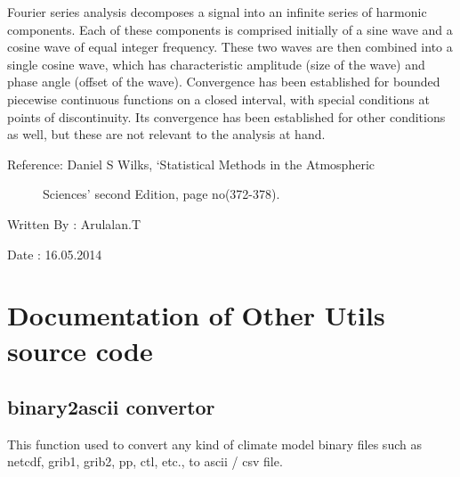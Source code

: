 \documentclass[letterpaper,10pt,english]{sphinxmanual}
\begin{document}
\begin{fulllineitems}
Fourier series analysis decomposes a signal into an infinite series of 
harmonic components. Each of these components is comprised initially of 
a sine wave and a cosine wave of equal integer frequency. These two waves
are then combined into a single cosine wave, which has characteristic 
amplitude (size of the wave) and phase angle (offset of the wave). 
Convergence has been established for bounded piecewise continuous 
functions on a closed interval, with special conditions at points of
discontinuity. Its convergence has been established for other conditions
as well, but these are not relevant to the analysis at hand.
\begin{description}
\item[{Reference: Daniel S Wilks, `Statistical Methods in the Atmospheric }] \leavevmode
Sciences' second Edition, page no(372-378).

\end{description}

Written By : Arulalan.T

Date : 16.05.2014

\end{fulllineitems}



\chapter{Documentation of \textbf{Other Utils} source code}
\label{others:other}\label{others::doc}\label{others:documentation-of-other-utils-source-code}

\section{binary2ascii convertor}
\label{others:binary2ascii-convertor}
This function used to convert any kind of climate model binary files such as netcdf, grib1, grib2, pp, ctl, etc., to ascii / csv file.
\label{others:binary2ascii}\label{others:module-binary2ascii}\label{others:binary2ascii}
\end{document}
